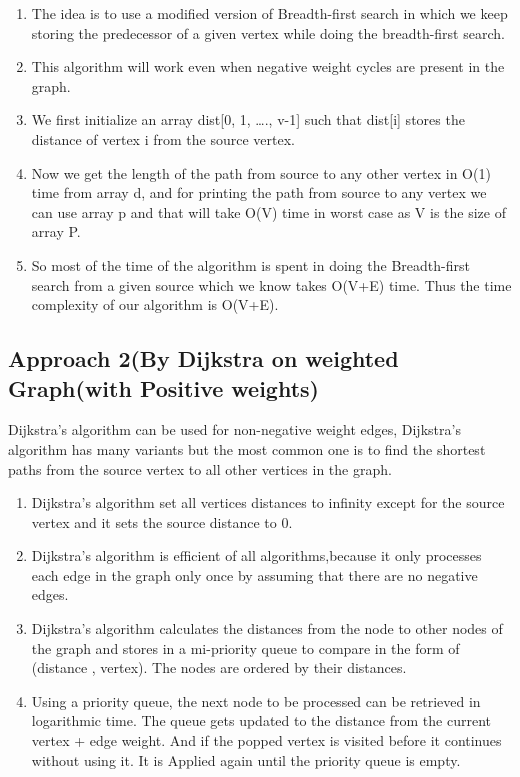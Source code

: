 \documentclass[conference]{IEEEtran}
\begin{document}
\begin{enumerate}
\item  The idea is to use a modified version of Breadth-first search in which we keep storing the predecessor of a given vertex while doing the breadth-first search. 
\item This algorithm will work even when negative weight cycles are present in the graph. 
\item We first initialize an array dist[0, 1, …., v-1]  such that dist[i] stores the distance of vertex i from the source vertex.
\item Now we get the length of the path from source to any other vertex in O(1) time from array d, and for printing the path from source to any vertex we can use array p and that will take O(V) time in worst case as V is the size of array P. 
\item So most of the time of the algorithm is spent in doing the Breadth-first search from a given source which we know takes O(V+E) time. Thus the time complexity of our algorithm is O(V+E). 
\end{enumerate}

\subsection{ \textbf{Approach 2(By Dijkstra on weighted Graph(with Positive weights)}}
Dijkstra's algorithm can be used for non-negative weight edges, Dijkstra's algorithm has many variants but the most common one is to find the shortest paths from the source vertex to all other vertices in the graph.

\begin{enumerate}
\item Dijkstra’s  algorithm set all vertices distances to infinity except for the source vertex and it sets the source distance to 0. 
\item Dijkstra’s  algorithm  is  efficient of all algorithms,because it  only  processes  each  edge  in  the  graph only once by assuming  that there are no negative edges.
\item Dijkstra’s algorithm calculates the distances from the node to other nodes of the graph and stores in a mi-priority queue to compare in the form of (distance , vertex). The nodes are ordered   by  their  distances. 
\item Using  a priority queue, the next node to be processed can be retrieved in logarithmic time. The queue gets updated to the distance from the current vertex + edge weight. And if the popped vertex is visited before it continues without using it. It is Applied again until the priority queue is empty.
\end{enumerate}
\end{document}
